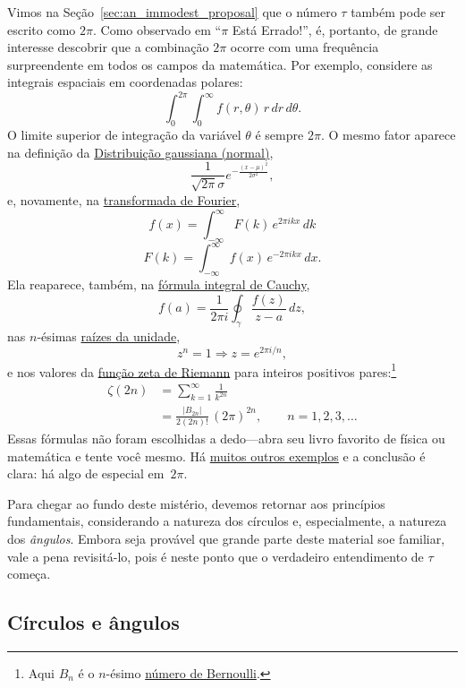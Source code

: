 Vimos na Seção~\ref{sec:an_immodest_proposal} que o número $\tau$ também pode ser escrito como $2\pi$. Como observado em ``$\pi$ Está Errado!'', é, portanto, de grande interesse descobrir que a combinação $2\pi$ ocorre com uma frequência surpreendente em todos os campos da matemática. Por exemplo, considere as integrais espaciais em coordenadas polares:
\[
  \int_0^{2\pi}\int_0^\infty f(r, \theta)\, r\, dr\, d\theta.
\]
O limite superior de integração da variável $\theta$ é sempre $2\pi$. O mesmo fator aparece na definição da \href{https://pt.wikipedia.org/wiki/Distribui%C3%A7%C3%A3o_normal}{Distribuição gaussiana (normal)},
\[
  \frac{1}{\sqrt{2\pi}\sigma}e^{-\frac{(x-\mu)^2}{2\sigma^2}},
\]
e, novamente, na \href{https://mathworld.wolfram.com/FourierTransform.html}{transformada de Fourier},
\[
  f(x) = \int_{-\infty}^\infty F(k)\, e^{2\pi ikx}\,dk
\]
\[
    F(k) = \int_{-\infty}^\infty f(x)\, e^{-2\pi ikx}\,dx.
\]
Ela reaparece, também, na \href{https://pt.wikipedia.org/wiki/F%C3%B3rmula_integral_de_Cauchy}{fórmula integral de Cauchy},
\[
  f(a) = \frac{1}{2\pi i}\oint_\gamma\frac{f(z)}{z-a}\,dz,
\]
nas $n$-ésimas \href{https://pt.wikipedia.org/wiki/Raiz_da_unidade}{raízes da unidade},
\[
  z^n = 1 \Rightarrow z = e^{2\pi i/n},
\]
e nos valores da \href{https://pt.wikipedia.org/wiki/Fun%C3%A7%C3%A3o_zeta_de_Riemann}{função zeta de Riemann} para inteiros positivos pares:\footnote{Aqui $B_n$ é o $n$-ésimo \href{https://pt.wikipedia.org/wiki/N%C3%BAmeros_de_Bernoulli}{número de Bernoulli}.}
\[
\begin{split}
  \zeta(2n) & = \sum_{k=1}^\infty \frac{1}{k^{2n}} \\
            & = \frac{|B_{2n}|}{2(2n)!}\,(2\pi)^{2n},\qquad n = 1, 2, 3, \ldots
\end{split}
\]
Essas fórmulas não foram escolhidas a dedo---abra seu livro favorito de física ou matemática e tente você mesmo. Há \href{http://www.harremoes.dk/Peter/Undervis/Turnpage/Turnpage1.html}{muitos outros exemplos} e a conclusão é clara: há algo de especial em~$2\pi$.

Para chegar ao fundo deste mistério, devemos retornar aos princípios fundamentais, considerando a natureza dos círculos e, especialmente, a natureza dos \emph{ângulos}. Embora seja provável que grande parte deste material soe familiar, vale a pena revisitá-lo, pois é neste ponto que o verdadeiro entendimento de $\tau$ começa.

  \subsection{Círculos e ângulos} %
  \label{sec:circles_and_angles}

